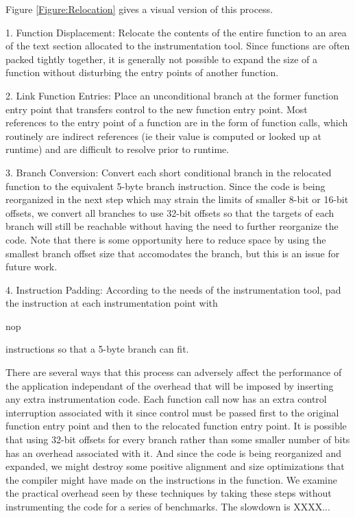 Figure \ref{Figure:Relocation} gives a visual version of this process.

1. Function Displacement: Relocate the contents of the entire function to an area of the text section allocated
to the instrumentation tool. Since functions are often packed tightly together, it is generally not possible to
expand the size of a function without disturbing the entry points of another function.

2. Link Function Entries: Place an unconditional branch at the former function entry point that transfers control
to the new function entry point. Most references to the entry point of a function are in the form of function calls, which
routinely are indirect references (ie their value is computed or looked up at runtime) and are difficult to resolve
prior to runtime.

3. Branch Conversion: Convert each short conditional branch in the relocated function to the equivalent
5-byte branch instruction. Since the code is being reorganized in the next step which may strain the limits of
smaller 8-bit or 16-bit offsets, we convert all branches to use 32-bit offsets so that the targets of each branch
will still be reachable without having the need to further reorganize the code. Note that there is some opportunity
here to reduce space by using the smallest branch offset size that accomodates the branch, but this is an issue
for future work.

4. Instruction Padding: According to the needs of the instrumentation tool, pad the instruction at each instrumentation
point with \begin{it}nop\end{it} instructions so that a 5-byte branch can fit.

There are several ways that this process can adversely affect the performance of the application independant of the overhead
that will be imposed by inserting any extra instrumentation code. Each function call
now has an extra control interruption associated with it since control must be passed first to the original function entry
point and then to the relocated function entry point. It is possible that using 32-bit offsets for every branch rather than
some smaller number of bits has an overhead associated with it. And since the code is being reorganized and expanded, 
we might destroy some positive alignment and size optimizations that the compiler might have made on the instructions in the
function. We examine the practical overhead seen by these techniques by taking these steps without instrumenting the code
for a series of benchmarks. The slowdown is XXXX...

